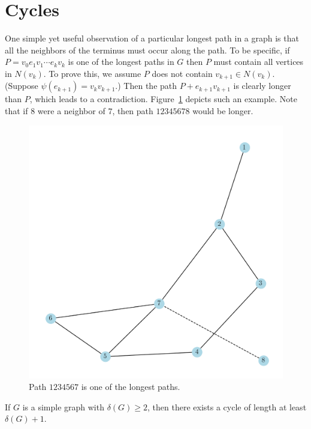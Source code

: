 \documentclass[thmcnt=section, 12pt, color=cyan]{my-elegantbook}
\begin{document}
\section{Cycles}


One simple yet useful observation of a particular longest path 
in a graph is that all the neighbors of the terminus must 
occur along the path. To be specific, 
if $P = v_0 e_1 v_1 \cdots e_k v_k$ is one of the longest paths in $G$ 
then $P$ must contain all vertices in $N(v_k)$. 
To prove this, we assume $P$ does not contain $v_{k+1} \in N(v_k)$. 
(Suppose $\psi(e_{k+1}) = v_k v_{k+1}$.) 
Then the path $P + e_{k+1}v_{k+1}$ is clearly longer than $P$, 
which leads to a contradiction. 
Figure~\ref{fig:1} depicts such an example. 
Note that if $8$ were a neighbor of $7$, 
then path $12345678$ would be longer.

\begin{figure}[ht]
    \centering
    \includegraphics[scale=0.5]{figures/g-001.png}
    \caption{Path $1234567$ is one of the longest paths.}
    \label{fig:1}
\end{figure}


\begin{proposition} \label{pro:5}
    If $G$ is a simple graph with $\delta(G) \geq 2$, 
	then there exists a cycle of length 
	at least $\delta(G)+1$.
\end{proposition}
\end{document}
